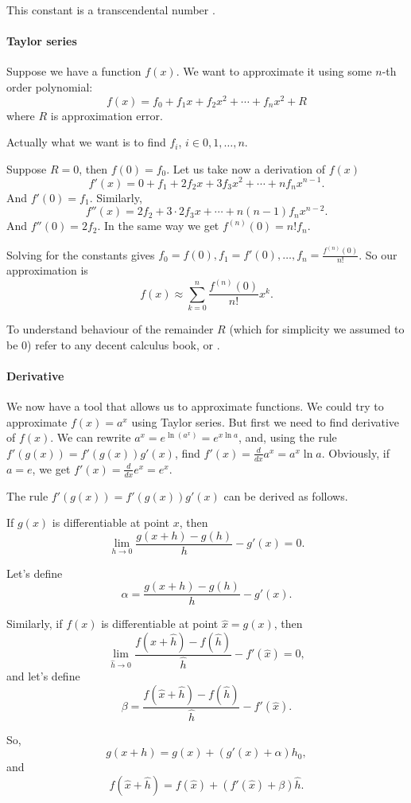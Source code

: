 \documentclass[10pt]{article}
\begin{document}
This constant is a transcendental number \cite{Niven2005}.

\paragraph{Taylor series} Suppose we have a function $f(x)$. We want to
approximate it using some $n$-th order polynomial: $$f(x)=f_0 +
f_1x+f_2x^2+\cdots+f_nx^2 + R$$ where $R$ is approximation error.

Actually what we want is to find $f_i$, $i \in 0, 1, \ldots, n$. 

Suppose $R = 0$, then $f(0)=f_0$. Let us take now a derivation of $f(x)$
$$f'(x)=0 + f_1 + 2f_2x + 3 f_3x^2 + \cdots + nf_nx^{n-1}.$$ And $f'(0)= f_1$.
Similarly, $$f''(x)=2f_2 + 3 \cdot 2 f_3x + \cdots + n (n-1)f_nx^{n-2}.$$ And
$f''(0) = 2f_2$. In the same way we get $f^{(n)}(0)=n!f_n$.

Solving for the constants gives $f_0=f(0), f_1=f'(0), \ldots,
f_n=\frac{f^{(n)}(0)}{n!}$. So our approximation is $$f(x) \approx
\sum_{k=0}^{n}\frac{f^{(n)}(0)}{n!}x^k.$$

To understand behaviour of the remainder $R$ (which for simplicity we
assumed to be $0$) refer to any decent calculus book, or \cite{Smith}.

\paragraph{Derivative} We now have a tool that allows us to approximate
functions. We could try to approximate $f(x)=a^x$ using Taylor series. But
first we need to find derivative of $f(x)$. We can rewrite
$a^x=e^{\ln(a^x)}=e^{x\ln a}$, and, using the rule $f'(g(x))=f'(g(x))g'(x)$,
find $f'(x)=\frac{d}{dx}a^x=a^x\ln a$.  Obviously, if $a = e$, we get
$f'(x)=\frac{d}{dx}e^x=e^x$.

The rule $f'(g(x))=f'(g(x))g'(x)$ can be derived as follows. 

If $g(x)$ is differentiable at point $x$, then
$$\lim_{h\to 0}\frac{g(x+h)-g(h)}{h}-g'(x)=0.$$

Let's define
$$\alpha = \frac{g(x+h)-g(h)}{h}-g'(x).$$

Similarly, if $f(x)$ is differentiable at point $\hat{x}=g(x)$, then
$$\lim_{\hat{h}\to 0}\frac{f(\hat{x}+\hat{h})-f(\hat{h})}{\hat{h}}-f'(\hat{x})=0,$$
and let's define
$$\beta = \frac{f(\hat{x}+\hat{h})-f(\hat{h})}{\hat{h}}-f'(\hat{x}).$$

So,
$$g(x+h)=g(x)+(g'(x)+\alpha)h_0,$$
and
$$f(\hat{x}+\hat{h})=f(\hat{x})+(f'(\hat{x})+\beta)\hat{h}.$$
\end{document}
